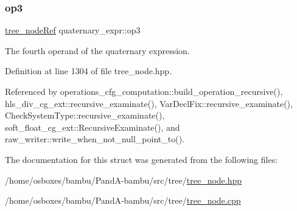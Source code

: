 \mbox{\label{structquaternary__expr_ae4aff421c78657dc000c1afbf150e2c2}} 
\subsubsection{\texorpdfstring{op3}{op3}}
{\footnotesize\ttfamily \hyperlink{tree__node_8hpp_a6ee377554d1c4871ad66a337eaa67fd5}{tree\+\_\+node\+Ref} quaternary\+\_\+expr\+::op3}



The fourth operand of the quaternary expression. 



Definition at line 1304 of file tree\+\_\+node.\+hpp.



Referenced by operations\+\_\+cfg\+\_\+computation\+::build\+\_\+operation\+\_\+recursive(), hls\+\_\+div\+\_\+cg\+\_\+ext\+::recursive\+\_\+examinate(), Var\+Decl\+Fix\+::recursive\+\_\+examinate(), Check\+System\+Type\+::recursive\+\_\+examinate(), soft\+\_\+float\+\_\+cg\+\_\+ext\+::\+Recursive\+Examinate(), and raw\+\_\+writer\+::write\+\_\+when\+\_\+not\+\_\+null\+\_\+point\+\_\+to().



The documentation for this struct was generated from the following files\+:\begin{DoxyCompactItemize}
\item 
/home/osboxes/bambu/\+Pand\+A-\/bambu/src/tree/\hyperlink{tree__node_8hpp}{tree\+\_\+node.\+hpp}\item 
/home/osboxes/bambu/\+Pand\+A-\/bambu/src/tree/\hyperlink{tree__node_8cpp}{tree\+\_\+node.\+cpp}\end{DoxyCompactItemize}
